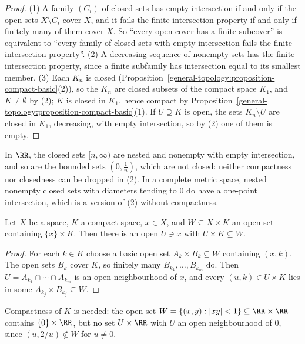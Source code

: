 \begin{proof}
(1) A family $(C_i)$ of closed sets has empty intersection if and only if the open sets $X \setminus C_i$ cover $X$, and it fails the finite intersection property if and only if finitely many of them cover $X$. So ``every open cover
has a finite subcover'' is equivalent to ``every family of closed sets with empty intersection fails the finite intersection property''. (2) A decreasing sequence of nonempty sets has the finite intersection property, since a finite
subfamily has intersection equal to its smallest member. (3) Each $K_n$ is closed (Proposition~\ref{general-topology:proposition-compact-basic}(2)), so the $K_n$ are closed subsets of the compact space $K_1$, and $K \neq \emptyset$ by (2); $K$ is
closed in $K_1$, hence compact by Proposition~\ref{general-topology:proposition-compact-basic}(1). If $U \supseteq K$ is open, the sets $K_n \setminus U$ are closed in $K_1$, decreasing, with empty intersection, so by (2) one of them is empty.
\end{proof}

\begin{counterexample}\label{general-topology:counterexample-fip}
In $\RR$, the closed sets $[n, \infty)$ are nested and nonempty with empty intersection, and so are the bounded sets $(0, \frac1n)$, which are not closed: neither compactness nor closedness can be dropped in (2). In a complete metric space,
nested nonempty closed sets with diameters tending to $0$ do have a one-point intersection, which is a version of (2) without compactness.
\end{counterexample}

\begin{lemma}\label{general-topology:lemma-tube}
Let $X$ be a space, $K$ a compact space, $x \in X$, and $W \subseteq X \times K$ an open set containing $\{x\} \times K$. Then there is an open $U \ni x$ with $U \times K \subseteq W$.
\end{lemma}

\begin{proof}
For each $k \in K$ choose a basic open set $A_k \times B_k \subseteq W$ containing $(x, k)$. The open sets $B_k$ cover $K$, so finitely many $B_{k_1}, \ldots, B_{k_m}$ do. Then $U = A_{k_1} \cap \cdots \cap A_{k_m}$ is an open neighbourhood of $x$,
and every $(u, k) \in U \times K$ lies in some $A_{k_j} \times B_{k_j} \subseteq W$.
\end{proof}

\begin{counterexample}\label{general-topology:counterexample-tube}
Compactness of $K$ is needed: the open set $W = \{(x, y) : |xy| < 1\} \subseteq \RR \times \RR$ contains $\{0\} \times \RR$, but no set $U \times \RR$ with $U$ an open neighbourhood of $0$, since $(u, 2/u) \notin W$ for $u \neq 0$.
\end{counterexample}


